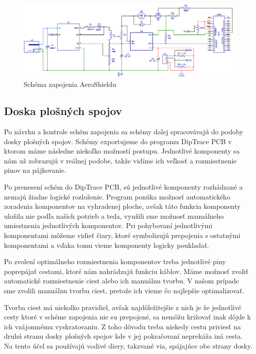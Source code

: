 \begin{figure}[!tbh]
\includegraphics[width=\textwidth]{obr/aeroSchema.png}
\caption{Schéma zapojenia AeroShieldu}\label{OBRAZOK 2.3}
\end{figure}

\subsection{Doska plošných spojov}

Po návrhu a kontrole schém zapojenia sa schémy dalej spracovávajú do podoby dosky plošných spojov. Schémy exportujeme do programu DipTrace PCB v ktorom máme následne niekoľko možností postupu. Jednotlivé komponenty sa nám už zobrazujú v reálnej podobe, takže vidíme ich veľkosť a rozmiestnenie pinov na pájkovanie.

Po prenesení schém do DipTrace PCB, sú jednotlivé komponenty rozhádzané a nemajú žiadne logické rozloženie. Program ponúka možnosť automatického zoradenia komponentov na vyhradenej ploche, avšak táto funkcia komponenty uložila nie podľa našich potrieb a teda, využili sme možnosť manuálneho umiestnenia jednotlivých komponentov. Pri pohybovaní jednotlivými komponentami môžeme vidieť čiary, ktoré symbolizujú prepojenia s ostatnými komponentami a vďaka tomu vieme komponenty logicky poukladať.

Po zvolení optimálneho rozmiestnenia komponentov treba jednotlivé piny poprepájať cestami, ktoré nám nahrádzajú funkciu káblov. Máme možnosť zvoliť automatické rozmiestnenie ciest alebo ich manuálnu tvorbu. V našom prípade sme zvolili manuálnu tvorbu ciest, pretože ich vieme čo najlepšie optimalizovať.

Tvorba ciest má niekolko pravidiel, avšak najdôležitejšie z nich je že jednotlivé cesty ktoré v schéme zapojenia nie su prepojené, sa nemôžu križovať inak dôjde k ich vzájomnému vyskratovaniu. Z toho dôvodu treba niekedy cestu priviesť na druhú stranu dosky plošných spojov kde v jej pokračovaní neprekáža iná cesta. Na tento účel sa používajú vodivé diery, takzvané via, spájajúce obe strany dosky.

